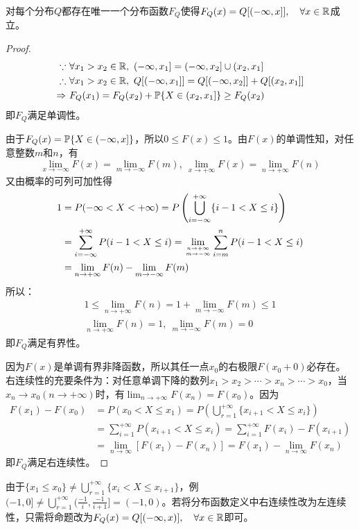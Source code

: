 \begin{proposition}
    对每个分布$Q$都存在唯一一个分布函数$F_Q$使得$F_Q(x)=Q[(-\infty,x]], \quad \forall x \in \R$成立。
\end{proposition}
\begin{proof}
    \begin{align*}
        \because \      & \forall x_1>x_2 \in \mathbb{R},\ (-\infty,x_1]=(-\infty,x_2] \cup (x_2,x_1]     \\
        \therefore \    & \forall x_1>x_2 \in \mathbb{R},\ Q[(-\infty,x_1]]=Q[(-\infty,x_2]]+Q[(x_2,x_1]] \\
        \Rightarrow  \  & F_{Q}(x_1)=F_{Q}(x_2)+\P\{X\in(x_2,x_1]\}\ge F_{Q}(x_2)
    \end{align*}
    即$F_Q$满足单调性。

    由于$F_Q(x)=\P\{X\in(-\infty,x]\}$，所以$0\le F(x)\le 1$。由$F(x)$的单调性知，对任意整数$m$和$n$，有
    \[ \lim_{x \rightarrow-\infty} F(x)=\lim_{m \rightarrow-\infty} F(m),\ \lim_{x \rightarrow+\infty} F(x)=\lim_{n \rightarrow+\infty} F(n) \]
    又由概率的可列可加性得
    \begin{align*}
        1 & = P(-\infty<X<+\infty) = P\left(\bigcup_{i=-\infty}^{+\infty}\{i-1<X \le i\}\right)                                               \\
          & = \sum_{i=-\infty}^{+\infty} P(i-1<X \le i)=\lim_{n \rightarrow+\infty \atop m \rightarrow-\infty} \sum_{i =m}^{n} P(i-1<X \le i) \\
          & =\lim_{n \rightarrow+\infty} F(n)-\lim_{m \rightarrow-\infty} F(m)
    \end{align*}
    所以：
    \begin{gather}
        1 \le \lim_{n \rightarrow+\infty} F(n)=1+\lim_{m \rightarrow-\infty} F(m) \le 1 \\
        \lim_{n \rightarrow+\infty} F(n)=1 ,\ \lim_{m \rightarrow-\infty} F(m)=0
    \end{gather}
    即$F_Q$满足有界性。

    因为$F(x)$是单调有界非降函数，所以其任一点$x_0$的右极限$F(x_0+0)$必存在。右连续性的充要条件为：对任意单调下降的数列$x_1>x_2>\cdots>x_n>\cdots>x_0$，当$x_n \rightarrow x_0(n \rightarrow+\infty)$时，有$\lim _{n \rightarrow+\infty} F(x_n)=F(x_0)$。因为
    \begin{align*}
        F(x_1)-F(x_0) & =P(x_0 <X \le x_1)=P\left(\bigcup_{r=1}^{+\infty}\{x_{i+1}<X \le x_i\}\right)           \\
                      & =\sum_{i=1}^{+\infty} P(x_{i+1}<X \le x_i)=\sum_{i=1}^{+\infty}F(x_i)-F(x_{i+1})        \\
                      & =\lim _{n \rightarrow \infty}[F(x_1)-F(x_n)]=F(x_1)-\lim _{n \rightarrow \infty} F(x_n)
    \end{align*}
    即$F_Q$满足右连续性。
\end{proof}
\begin{note}
    由于$\{ x_1 \le x_0 \} \neq \bigcup_{r=1}^{+\infty}\{x_i < X \le x_{i+1}\}$，例$(-1,0]\neq \bigcup_{r=1}^{+\infty}(\frac{-1}{i},\frac{-1}{i+1}]=(-1,0)$。若将分布函数定义中右连续性改为左连续性，只需将命题改为$F_Q(x)=Q[(-\infty,x)], \quad \forall x \in \R$即可。
\end{note}

